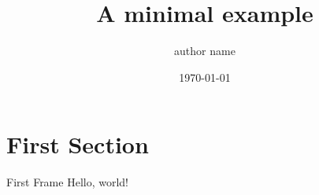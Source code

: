 \documentclass{beamer}
\title{A minimal example}
\date{\today}
\author{author name}
\institute{name of the institute}
\begin{document}
  \maketitle
  \section{First Section}
  \begin{frame}{First Frame}
    Hello, world!
  \end{frame}
\end{document}
